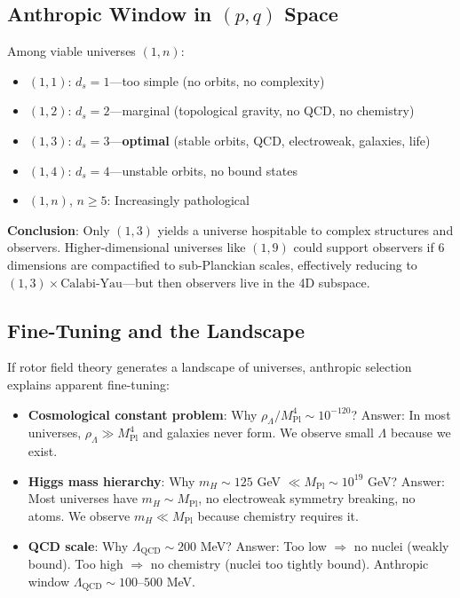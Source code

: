 \documentclass[11pt,a4paper]{article}
\numberwithin{equation}{section}
\theoremstyle{plain}
\theoremstyle{definition}
\theoremstyle{remark}
\begin{document}
\subsection{Anthropic Window in $(p,q)$ Space}

Among viable universes $(1,n)$:

\begin{itemize}
\item $(1,1)$: $d_s = 1$—too simple (no orbits, no complexity)
\item $(1,2)$: $d_s = 2$—marginal (topological gravity, no QCD, no chemistry)
\item $(1,3)$: $d_s = 3$—\textbf{optimal} (stable orbits, QCD, electroweak, galaxies, life)
\item $(1,4)$: $d_s = 4$—unstable orbits, no bound states
\item $(1,n)$, $n \geq 5$: Increasingly pathological
\end{itemize}

\textbf{Conclusion}: Only $(1,3)$ yields a universe hospitable to complex structures and observers. Higher-dimensional universes like $(1,9)$ could support observers if 6 dimensions are compactified to sub-Planckian scales, effectively reducing to $(1,3) \times \text{Calabi-Yau}$—but then observers live in the 4D subspace.

\subsection{Fine-Tuning and the Landscape}

If rotor field theory generates a landscape of universes, anthropic selection explains apparent fine-tuning:

\begin{itemize}
\item \textbf{Cosmological constant problem}: Why $\rho_\Lambda/M_{\text{Pl}}^4 \sim 10^{-120}$? Answer: In most universes, $\rho_\Lambda \gg M_{\text{Pl}}^4$ and galaxies never form. We observe small $\Lambda$ because we exist.

\item \textbf{Higgs mass hierarchy}: Why $m_H \sim 125$ GeV $\ll M_{\text{Pl}} \sim 10^{19}$ GeV? Answer: Most universes have $m_H \sim M_{\text{Pl}}$, no electroweak symmetry breaking, no atoms. We observe $m_H \ll M_{\text{Pl}}$ because chemistry requires it.

\item \textbf{QCD scale}: Why $\Lambda_{\text{QCD}} \sim 200$ MeV? Answer: Too low $\Rightarrow$ no nuclei (weakly bound). Too high $\Rightarrow$ no chemistry (nuclei too tightly bound). Anthropic window $\Lambda_{\text{QCD}} \sim 100$--$500$ MeV.
\end{itemize}
\end{document}
